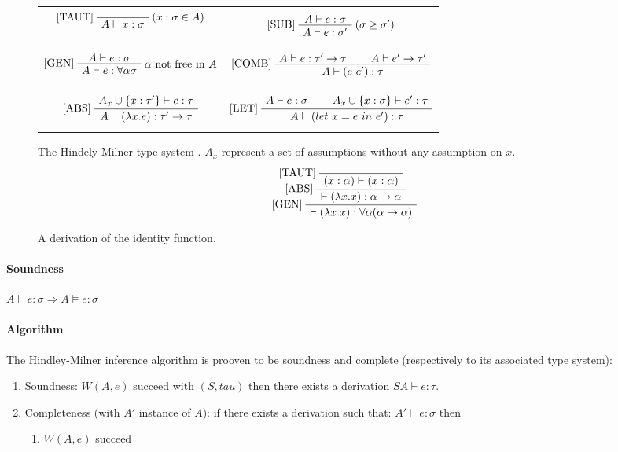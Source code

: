 \documentclass[a4paper]{report}
\newcommand{\ax}[1]%
{\AxiomC{$#1$}}
\newcommand{\unc}[1]%
{\UnaryInfC{$#1$}}
\newcommand{\bic}[1]%
{\BinaryInfC{$#1$}}
\newcommand{\drule}%
{\DisplayProof}
\begin{document}
\begin{figure}
\begin{tabular}{cc}
$$\ax{}
\LeftLabel{[TAUT]}
\RightLabel{$(x:\sigma\in A)$}
\unc{A\vdash x:\sigma}
\drule$$
&
$$\ax{A\vdash e:\sigma}
\LeftLabel{[SUB]}
\RightLabel{$(\sigma\geq\sigma')$}
\unc{A\vdash e:\sigma'}
\drule$$
\\
$$\ax{A\vdash e:\sigma}
\LeftLabel{[GEN]}
\RightLabel{$\alpha$ not free in $A$}
\unc{A\vdash e:\forall\alpha\sigma}
\drule$$
&
$$\ax{A\vdash e:\tau'\to\tau}
\ax{A\vdash e'\to \tau'}
\LeftLabel{[COMB]}
\bic{A\vdash (e\ e'):\tau}
\drule$$
\\
$$\ax{A_x\cup\{x:\tau'\}\vdash e:\tau}
\LeftLabel{[ABS]}
\unc{A\vdash (\lambda x.e):\tau'\to\tau}
\drule$$
&
$$\ax{A\vdash e:\sigma}
\ax{A_x\cup\{x:\sigma\}\vdash e':\tau}
\LeftLabel{[LET]}
\bic{A\vdash(let\ x=e\ in\ e'):\tau}
\drule$$
\end{tabular}
\caption{The Hindely Milner type system \cite{hm2}. $A_x$ represent a set of assumptions without any assumption on $x$.}
\label{hmts}
\end{figure}

\begin{figure}
\centering
$$
\ax{}
\LeftLabel{[TAUT]}
\unc{(x:\alpha)\vdash(x:\alpha)}
\LeftLabel{[ABS]}
\unc{\vdash (\lambda x.x):\alpha\to\alpha}
\LeftLabel{[GEN]}
\unc{\vdash (\lambda x.x):\forall \alpha (\alpha\to\alpha)}
\drule$$
\caption{A derivation of the identity function.}
\label{derivid}
\end{figure}

\paragraph{Soundness} $A\vdash e:\sigma\Rightarrow A\vDash e:\sigma$

\paragraph{Algorithm} The Hindley-Milner inference algorithm is prooven to be soundness and complete (respectively to its associated type system):
\begin{enumerate}
\item Soundness: $W(A,e)$ succeed with $(S,tau)$ then there exists a derivation $SA\vdash e:\tau$.
\item Completeness (with $A'$ instance of $A$): if there exists a derivation such that: $A'\vdash e: \sigma$ then
	\begin{enumerate}
	\item $W(A,e)$ succeed
	\end{enumerate}
\end{enumerate}
\end{document}
